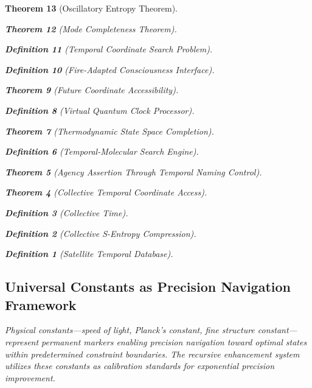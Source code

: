 \documentclass[12pt,a4paper]{article}
\newtheorem{theorem}{Theorem}[section]
\newtheorem{definition}[theorem]{Definition}
\begin{document}
\begin{theorem}[Oscillatory Entropy Theorem]
\begin{theorem}[Mode Completeness Theorem]
\begin{enumerate}
\begin{definition}[Temporal Coordinate Search Problem]
\begin{algorithm}
\begin{definition}[Fire-Adapted Consciousness Interface]
\begin{theorem}[Future Coordinate Accessibility]
\begin{definition}[Virtual Quantum Clock Processor]
\begin{itemize}
\begin{itemize}
\begin{theorem}[Thermodynamic State Space Completion]
\begin{definition}[Temporal-Molecular Search Engine]
\begin{theorem}[Agency Assertion Through Temporal Naming Control]
\begin{remark}
\begin{theorem}[Collective Temporal Coordinate Access]
\begin{definition}[Collective Time]
\begin{definition}[Collective S-Entropy Compression]
\begin{definition}[Satellite Temporal Database]
\begin{algorithm}
\begin{table}[h]
{{\subsection{Universal Constants as Precision Navigation Framework}

Physical constants—speed of light, Planck's constant, fine structure constant—represent permanent markers enabling precision navigation toward optimal states within predetermined constraint boundaries. The recursive enhancement system utilizes these constants as calibration standards for exponential precision improvement.

\begin{figure}[h]
\centering
{}
\end{figure}}}
\end{table}
\end{algorithm}
\end{definition}
\end{definition}
\end{definition}
\end{theorem}
\end{remark}
\end{theorem}
\end{definition}
\end{theorem}
\end{itemize}
\end{itemize}
\end{definition}
\end{theorem}
\end{definition}
\end{algorithm}
\end{definition}
\end{enumerate}
\end{theorem}
\end{theorem}
\end{document}
